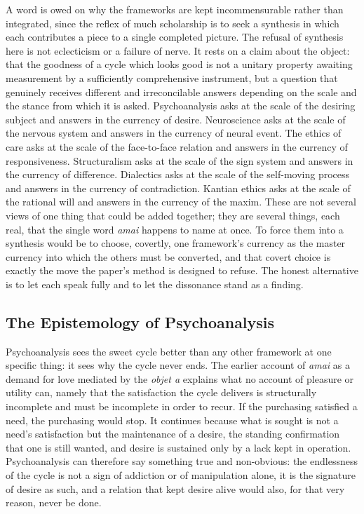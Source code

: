 A word is owed on why the frameworks are kept incommensurable rather than integrated, since the reflex of much scholarship is to seek a synthesis in which each contributes a piece to a single completed picture. The refusal of synthesis here is not eclecticism or a failure of nerve. It rests on a claim about the object: that the goodness of a cycle which looks good is not a unitary property awaiting measurement by a sufficiently comprehensive instrument, but a question that genuinely receives different and irreconcilable answers depending on the scale and the stance from which it is asked. Psychoanalysis asks at the scale of the desiring subject and answers in the currency of desire. Neuroscience asks at the scale of the nervous system and answers in the currency of neural event. The ethics of care asks at the scale of the face-to-face relation and answers in the currency of responsiveness. Structuralism asks at the scale of the sign system and answers in the currency of difference. Dialectics asks at the scale of the self-moving process and answers in the currency of contradiction. Kantian ethics asks at the scale of the rational will and answers in the currency of the maxim. These are not several views of one thing that could be added together; they are several things, each real, that the single word \textit{amai} happens to name at once. To force them into a synthesis would be to choose, covertly, one framework's currency as the master currency into which the others must be converted, and that covert choice is exactly the move the paper's method is designed to refuse. The honest alternative is to let each speak fully and to let the dissonance stand as a finding.

\subsection{The Epistemology of Psychoanalysis}

Psychoanalysis sees the sweet cycle better than any other framework at one specific thing: it sees why the cycle never ends. The earlier account of \textit{amai} as a demand for love mediated by the \textit{objet a} explains what no account of pleasure or utility can, namely that the satisfaction the cycle delivers is structurally incomplete and must be incomplete in order to recur. If the purchasing satisfied a need, the purchasing would stop. It continues because what is sought is not a need's satisfaction but the maintenance of a desire, the standing confirmation that one is still wanted, and desire is sustained only by a lack kept in operation. Psychoanalysis can therefore say something true and non-obvious: the endlessness of the cycle is not a sign of addiction or of manipulation alone, it is the signature of desire as such, and a relation that kept desire alive would also, for that very reason, never be done.

